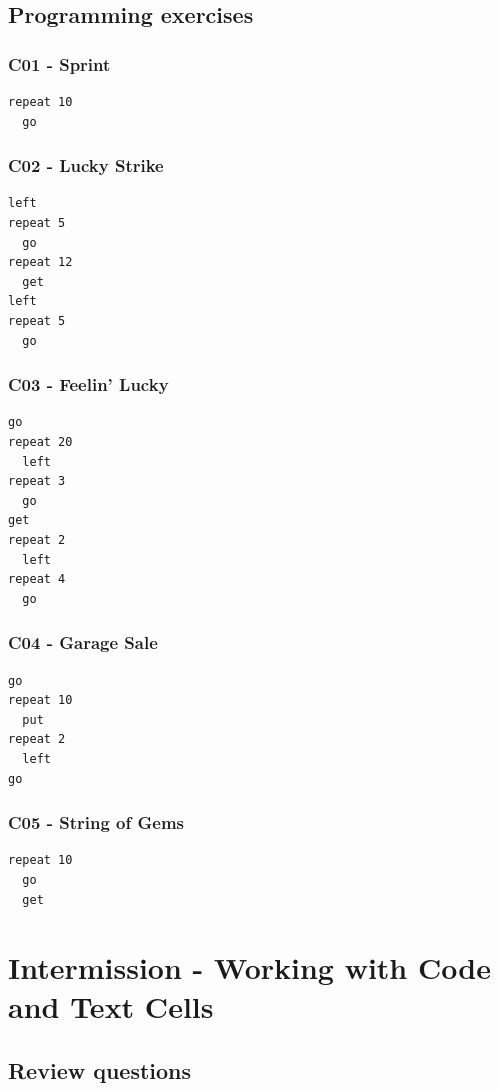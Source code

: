 \documentclass[article,A4,12pt]{llncs}
\begin{document}
\subsection{Programming exercises}

\subsubsection{C01 - Sprint}
\begin{verbatim}
repeat 10
  go
\end{verbatim}

\subsubsection{C02 - Lucky Strike}
\begin{verbatim}
left
repeat 5
  go
repeat 12
  get
left
repeat 5
  go
\end{verbatim}

\subsubsection{C03 - Feelin' Lucky}
\begin{verbatim}
go
repeat 20
  left
repeat 3 
  go
get
repeat 2
  left
repeat 4
  go
\end{verbatim}

\subsubsection{C04 - Garage Sale}
\begin{verbatim}
go
repeat 10
  put
repeat 2
  left
go
\end{verbatim}

\subsubsection{C05 - String of Gems}
\begin{verbatim}
repeat 10
  go
  get
\end{verbatim}


\section{Intermission - Working with Code and Text Cells}

\subsection{Review questions}
\end{document}
